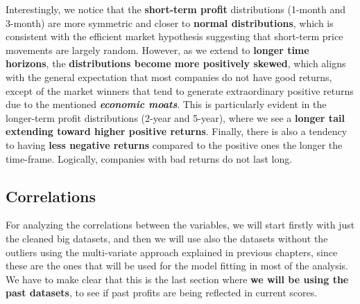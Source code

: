 \documentclass[11pt,english,a4paper,hidelinks]{book}
\begin{document}
\noindent Interestingly, we notice that the \textbf{short-term profit} distributions (1-month and 3-month) are more symmetric and closer to \textbf{normal distributions}, which is consistent with the efficient market hypothesis suggesting that short-term price movements are largely random. However, as we extend to \textbf{longer time horizons}, the \textbf{distributions become more positively skewed}, which aligns with the general expectation that most companies do not have good returns, except of the market winners that tend to generate extraordinary positive returns due to the mentioned \textbf{\textit{economic moats}}. This is particularly evident in the longer-term profit distributions (2-year and 5-year), where we see a \textbf{longer tail extending toward higher positive returns}. Finally, there is also a tendency to having \textbf{less negative returns} compared to the positive ones the longer the time-frame. Logically, companies with bad returns do not last long.

\subsection{Correlations}

For analyzing the correlations between the variables, we will start firstly with just the cleaned big datasets, and then we will use also the datasets without the outliers using the multi-variate approach explained in previous chapters, since these are the ones that will be used for the model fitting in most of the analysis. We have to make clear that this is the last section where \textbf{we will be using the past datasets}, to see if past profits are being reflected in current scores.
\end{document}
